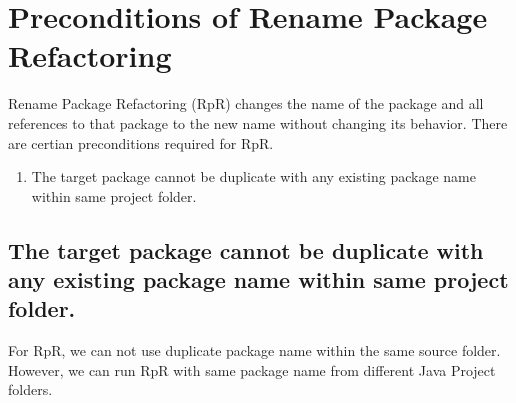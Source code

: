 \section{\textbf{Preconditions of Rename Package Refactoring}}

Rename Package Refactoring (RpR) changes the name of the package and all references to that package to the new name without changing its behavior.
There are certian preconditions required for RpR.

\begin{enumerate}
	\item The target package cannot be duplicate with any existing package name within same project folder. 
\end{enumerate}

\subsection{The target package cannot be duplicate with any existing package name within same project folder.}

For RpR, we can not use duplicate package name within the same source folder. However, we can run RpR with same package name from different Java Project folders.